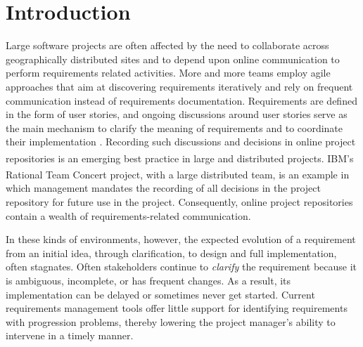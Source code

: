 \section{Introduction}

Large software projects are often affected by the need to collaborate across geographically distributed sites and to depend upon online communication to perform requirements related activities. 
More and more teams employ agile approaches that aim at discovering requirements iteratively and rely on frequent communication instead of requirements documentation. 
Requirements are defined in the form of user stories, and ongoing discussions around user stories serve as the main mechanism to clarify the meaning of requirements and to coordinate their implementation \cite{Cao2008}. 
Recording such discussions and decisions in online project repositories is an emerging best practice in large and distributed projects.
IBM\textsuperscript{\textregistered}'s Rational Team Concert\textsuperscript{\textregistered} project, with a large distributed team, is an example in which management mandates the recording of all decisions in the project repository for future use in the project\cite{Frost2007}. 
Consequently, online project repositories contain a wealth of requirements-related communication.

In these kinds of environments, however, the expected evolution of a requirement from an initial idea, through clarification, to design and full implementation, often stagnates. 
Often stakeholders continue to \emph{clarify} the requirement because it is ambiguous, incomplete, or has frequent changes. 
As a result, its implementation can be delayed or sometimes never get started. 
Current requirements management tools offer little support for identifying requirements with progression problems, thereby lowering the project manager's  ability to intervene in a timely manner.

